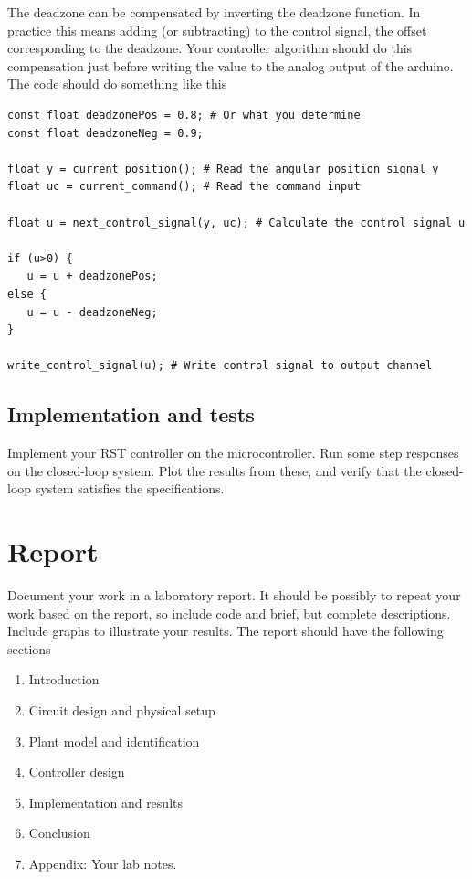 \documentclass[a4paper]{scrartcl}
\begin{document}
The deadzone can be compensated by inverting the deadzone function. In practice this means  adding (or subtracting) to the control signal, the offset corresponding to the deadzone. Your controller algorithm should do this compensation just before writing the value to the analog output of the arduino. The code should do something like this
\begin{verbatim}
const float deadzonePos = 0.8; # Or what you determine
const float deadzoneNeg = 0.9;

float y = current_position(); # Read the angular position signal y
float uc = current_command(); # Read the command input

float u = next_control_signal(y, uc); # Calculate the control signal u

if (u>0) {
   u = u + deadzonePos;
else {
   u = u - deadzoneNeg;
}

write_control_signal(u); # Write control signal to output channel
\end{verbatim}

\subsection*{Implementation and tests}
\label{sec-5-4}
Implement your RST controller on the microcontroller. Run some step responses on the closed-loop system. Plot the results from these, and verify that the closed-loop system satisfies the specifications.

\section*{Report}
\label{sec-6}
Document your work in a laboratory report. It should be possibly to repeat your work based on the report, so include code and brief, but complete descriptions. Include graphs to illustrate your results. The report should have the following sections
\begin{enumerate}
\item Introduction
\item Circuit design and physical setup
\item Plant model and identification
\item Controller design
\item Implementation and results
\item Conclusion
\item Appendix: Your lab notes.
\end{enumerate}
\end{document}
